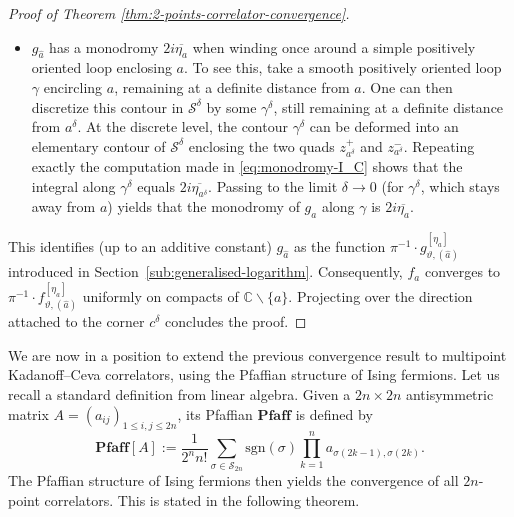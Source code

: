 \documentclass[reqno]{amsart}
\numberwithin{equation}{section}
\theoremstyle{definition}
\theoremstyle{remark}
\newcommand\cS{\mathcal{S}}
\begin{document}
\begin{proof}[Proof of Theorem \ref{thm:2-points-correlator-convergence}]
\begin{itemize}
	\item $g_{\hat{a}}$ has a monodromy $2i\overline{\eta_a}$ when winding once around a simple positively oriented loop enclosing $a$. To see this, take a smooth positively oriented loop $\gamma$ encircling $a$, remaining at a definite distance from $a$. One can then discretize this contour in $\cS^{\delta}$ by some $\gamma^{\delta}$, still remaining at a definite distance from $a^\delta$. At the discrete level, the contour $\gamma^{\delta}$ can be deformed into an elementary contour of $\cS^{\delta}$ enclosing the two quads $z^{+}_{a^\delta}$ and $z^{-}_{a^\delta}$. Repeating exactly the computation made in \eqref{eq:monodromy-I_C} shows that the integral along $\gamma^{\delta}$ equals $2i\overline{\eta_{a^\delta}}$. Passing to the limit $\delta \to 0$ (for $\gamma^\delta$, which stays away from $a$) yields that the monodromy of $g_a$ along $\gamma$ is $2i\overline{\eta_{a}}$.
\end{itemize}
This identifies (up to an additive constant) $g_{\hat{a}}$ as the function $\pi^{-1}\cdot g^{[\eta_a]}_{\vartheta,(\hat{a})}$ introduced in Section~\ref{sub:generalised-logarithm}. Consequently, $f_a$ converges to $\pi^{-1}\cdot f^{[\eta_a]}_{\vartheta,(\hat{a})}$ uniformly on compacts of $\mathbb{C}\backslash \{ a \}$. Projecting over the direction attached to the corner $c^\delta$ concludes the proof.
\end{proof}

We are now in a position to extend the previous convergence result to multipoint Kadanoff--Ceva correlators, using the Pfaffian structure of Ising fermions. Let us recall a standard definition from linear algebra. Given a $2n \times 2n$ antisymmetric matrix $A = (a_{ij})_{1 \leq i,j \leq 2n}$, its Pfaffian $\mathbf{Pfaff}$ is defined by
\begin{equation}
	\mathbf{Pfaff}[A] := \frac{1}{2^n n!} \sum\limits_{\sigma \in \mathcal{S}_{2n}} \mathrm{sgn}(\sigma) \prod\limits_{k=1}^{n} a_{\sigma(2k-1),\sigma(2k)}.
\end{equation}
The Pfaffian structure of Ising fermions then yields the convergence of all $2n$-point correlators. This is stated in the following theorem.
\end{document}
